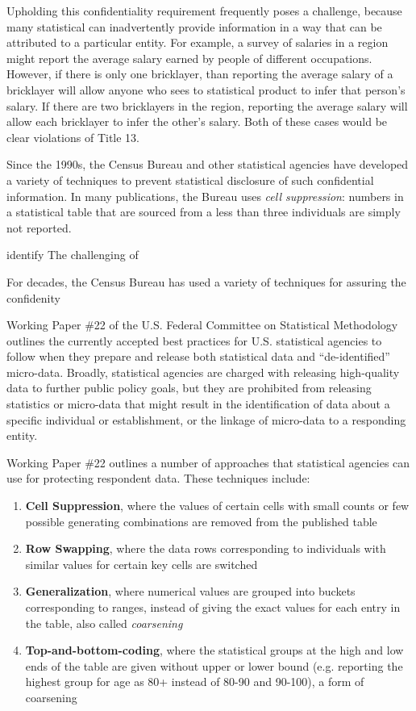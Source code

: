 \documentclass[runningheads]{llncs}
\begin{document}
Upholding this confidentiality requirement frequently poses a
challenge, because many statistical can inadvertently provide
information in a way that can be attributed to a particular
entity. For example, a survey of salaries in a region might report the
average salary earned by people of different occupations. However, if
there is only one bricklayer, than reporting the average salary of a
bricklayer will allow anyone who sees to statistical product to infer
that person's salary. If there are two bricklayers in the region,
reporting the average salary will allow each bricklayer to infer the
other's salary. Both of these cases would be clear violations of Title
13.

Since the 1990s, the Census Bureau and other statistical agencies have
developed a variety of techniques to prevent statistical disclosure of
such confidential information. In many publications, the Bureau uses
\emph{cell suppression}: numbers in a statistical table that are
sourced from a less than three individuals are simply not reported. 

identify The challenging of 

For decades, the Census Bureau has used a variety of techniques for
assuring the confidenity 

Working Paper \#22 of the U.S. Federal Committee on Statistical
Methodology\cite{workingpaper22} outlines the currently accepted best
practices for U.S. statistical agencies to follow when they prepare and
release both statistical data and ``de-identified''
micro-data. Broadly, statistical agencies are charged with releasing
high-quality data to further public policy goals, but they are
prohibited from releasing statistics or micro-data that might result in the
identification of data about a specific individual or establishment, or the linkage
of micro-data to a responding entity.

Working Paper \#22 outlines a number of approaches that statistical
agencies can use for protecting respondent data. These techniques include:
\begin{enumerate}
  \item \textbf{Cell Suppression}, where the values of certain  cells with small counts or few possible
        generating combinations are removed from the published table
  \item \textbf{Row Swapping}, where the data rows corresponding to individuals
        with similar values for certain key cells are switched
  \item \textbf{Generalization}, where numerical values are grouped into
        buckets corresponding to ranges, instead of giving the exact
        values for each entry in the table, also called \emph{coarsening}
  \item \textbf{Top-and-bottom-coding}, where the statistical groups at the high and low ends
        of the table are given without upper or lower bound (e.g.
        reporting the highest group for age as 80+ instead of
        80-90 and 90-100), a form of coarsening
\end{enumerate}
\end{document}
